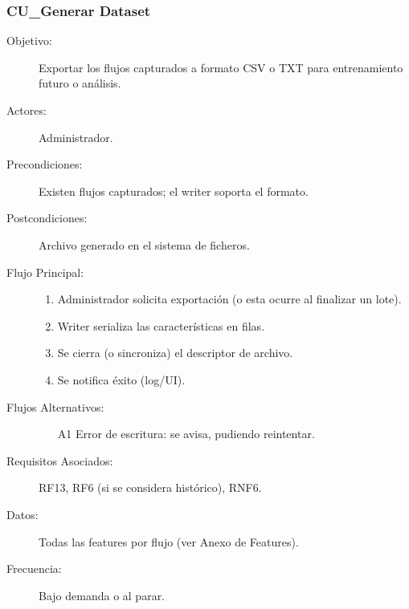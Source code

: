 \subsubsection{CU\_Generar Dataset}
\begin{description}
  \item[Objetivo:] Exportar los flujos capturados a formato CSV o TXT para entrenamiento futuro o análisis.
  \item[Actores:] Administrador.
  \item[Precondiciones:] Existen flujos capturados; el writer soporta el formato.
  \item[Postcondiciones:] Archivo generado en el sistema de ficheros.
  \item[Flujo Principal:]
    \begin{enumerate}
      \item Administrador solicita exportación (o esta ocurre al finalizar un lote).
      \item Writer serializa las características en filas.
      \item Se cierra (o sincroniza) el descriptor de archivo.
      \item Se notifica éxito (log/UI).
    \end{enumerate}
  \item[Flujos Alternativos:]
    \begin{enumerate}
      \item[A1] Error de escritura: se avisa, pudiendo reintentar.
    \end{enumerate}
  \item[Requisitos Asociados:] RF13, RF6 (si se considera histórico), RNF6.
  \item[Datos:] Todas las features por flujo (ver Anexo de Features).
  \item[Frecuencia:] Bajo demanda o al parar.
\end{description}

